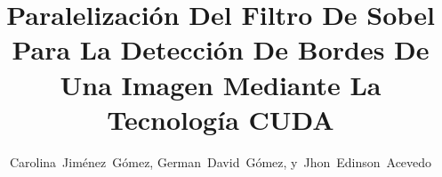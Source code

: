\documentclass[10pt,journal,compsoc]{IEEEtran}
\begin{document}
%
\title{Paralelización Del Filtro De Sobel 
Para La Detección De Bordes De Una Imagen 
Mediante La Tecnología CUDA  
}
%
%
%
%

\author{Carolina~Jiménez~Gómez,
        German~David~Gómez,
        y~Jhon~Edinson~Acevedo%
}
\end{document}
